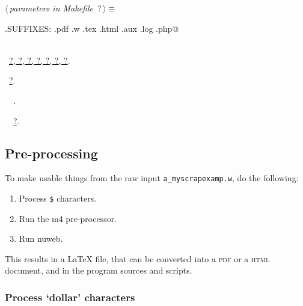 \documentclass[twoside]{artikel3}
\newcommand{\pdf}{\textsc{pdf}}
\newcommand{\HTML}{\textsc{html}}
\renewcommand{\NWlink}[2]{\hyperlink{#1}{#2}}
\renewcommand{\NWtarget}[2]{\hypertarget{#1}{#2}}
\renewcommand{\NWsep}{$\diamond$\rule[-1\baselineskip]{0pt}{1\baselineskip}}
\renewcommand{\NWlink}[2]{\hyperlink{#1}{#2}}
\renewcommand{\NWtarget}[2]{\hypertarget{#1}{#2}}
\begin{document}
\begin{flushleft} \small
\begin{minipage}{\linewidth}\label{scrap10}\raggedright\small
\NWtarget{nuweb?}{} $\langle\,${\itshape parameters in Makefile}\nobreak\ {\footnotesize {?}}$\,\rangle\equiv$
\vspace{-1ex}
\begin{list}{}{} \item
\mbox{}\verb@.SUFFIXES: .pdf .w .tex .html .aux .log .php@\\
\mbox{}\verb@@\\
\mbox{}\verb@@{\NWsep}
\end{list}
\vspace{-1.5ex}
\footnotesize
\begin{list}{}{\setlength{\itemsep}{-\parsep}\setlength{\itemindent}{-\leftmargin}}
\item \NWtxtMacroDefBy\ \NWlink{nuweb?}{?}\NWlink{nuweb?}{, ?}\NWlink{nuweb?}{, ?}\NWlink{nuweb?}{, ?}\NWlink{nuweb?}{, ?}\NWlink{nuweb?}{, ?}\NWlink{nuweb?}{, ?}.
\item \NWtxtMacroRefIn\ \NWlink{nuweb?}{?}.
\item \NWtxtIdentsDefed\nobreak\  \verb@SUFFIXES@\nobreak\ \NWtxtIdentsNotUsed.\item \NWtxtIdentsUsed\nobreak\  \verb@pdf@\nobreak\ \NWlink{nuweb?}{?}.
\item{}
\end{list}
\end{minipage}\vspace{4ex}
\end{flushleft}
\subsection{Pre-processing}
\label{sec:pre-processing}

To make usable things from the raw input \verb|a_myscrapexamp.w|, do the following:

\begin{enumerate}
\item Process \verb|$| characters.
\item Run the m4 pre-processor.
\item Run nuweb.
\end{enumerate}

This results in a \LaTeX{} file, that can be converted into a \pdf{}
or a \HTML{} document, and in the program sources and scripts.

\subsubsection{Process `dollar' characters }
\label{sec:procdollars}
\end{document}
